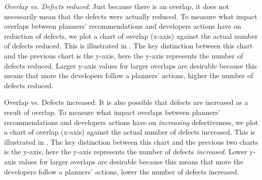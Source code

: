 \item \textit{Overlap vs. Defects reduced}: Just because there is an overlap, it does not necessarily mean that the defects were actually reduced. To measure what impact overlaps between planners' recommendations and developers actions have on reduction of defects, we plot a chart of overlap (x-axis) against the actual number of defects reduced. This is illustrated in . The key distinction between this chart and the previous chart is the y-axis, here the y-axis represents the number of defects reduced. Larger y-axis values for larger overlaps are desirable because this means that more the developers follow a planners' actions, higher the number of defects reduced.

\item {Overlap vs. Defects increased}: It is also possible that defects are increased as a result of overlap. To measure what impact overlaps between planners' recommendations and developers actions have on \textit{increasing} defectiveness, we plot a chart of overlap (x-axis) against the actual number of defects increased. This is illustrated in . The key distinction between this chart and the previous two charts is the y-axis, here the y-axis represents the number of defects \textit{increased}. Lower y-axis values for larger overlaps are desirable because this means that more the developers follow a planners' actions, lower the number of defects increased.
\ee




